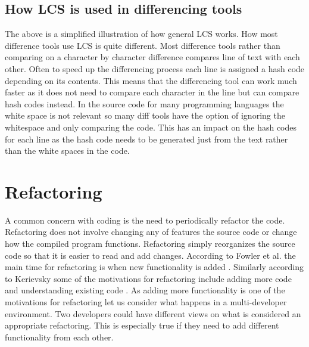 \subsection{How LCS is used in differencing tools}
The above is a simplified illustration of how general LCS works.
How most difference tools use LCS is quite different.
Most difference tools rather than comparing on a character by character difference compares line of text with each other.
Often to speed up the differencing process each line is assigned a hash code depending on its contents. 
This means that the differencing tool can work much faster as it does not need to compare each character in the line but can compare hash codes instead.
In the source code for many programming languages the white space is not relevant so many diff tools have the option of ignoring the whitespace and only comparing the code.
This has an impact on the hash codes for each line as the hash code needs to be generated just from the text rather than the white spaces in the code.
% 
 
 



\section{Refactoring}

A common concern with coding is the need to periodically refactor the code. Refactoring does not involve changing any of features the source code or change how the compiled program functions. Refactoring simply reorganizes the source code so that it is easier to read and add changes. According to Fowler et al. the main time for refactoring is when new functionality is added \cite{Fowler1999}. Similarly according to Kerievsky some of the motivations for refactoring include adding more code and understanding existing code \cite{Kerievsky2004}. As adding more functionality is one of the motivations for refactoring let us consider what happens in a multi-developer environment. Two developers could have different views on what is considered an appropriate refactoring. This is especially true if they need to add different functionality from each other. 

